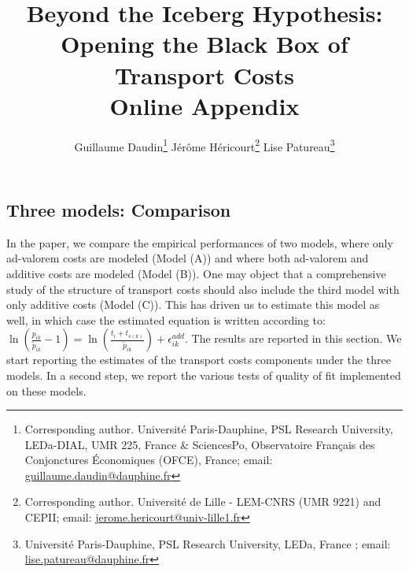 \documentclass[11pt,twoside, authoryear]{elsarticle}
\begin{document}
\title{\textbf{Beyond the Iceberg Hypothesis: \\Opening the Black Box of Transport Costs}\\Online Appendix}

\author{Guillaume Daudin\footnote{\noindent Corresponding author. Universit\'{e} Paris-Dauphine, PSL Research University, LEDa-DIAL, UMR 225, France \&
SciencesPo, Observatoire Français des Conjonctures \'{E}conomiques (OFCE), France; email: \url{guillaume.daudin@dauphine.fr}} \qquad \quad Jérôme Héricourt\footnote{\noindent Corresponding author. Université de Lille - LEM-CNRS (UMR 9221) and CEPII; email: \url{jerome.hericourt@univ-lille1.fr}} \qquad \quad Lise Patureau\footnote{\noindent Universit\'{e} Paris-Dauphine, PSL Research University, LEDa, France ; email: \url{lise.patureau@dauphine.fr}}}



\maketitle






\tableofcontents
\vspace{1cm}
\newpage
\listoftables

\newpage



%
%
%
%
%			
%			
%				
%
%

	\renewcommand\thesubsubsection{\Alph{subsection}.\arabic{subsubsection}}
	
	\renewcommand\thesubsection{\Alph{subsection}}
	
	
\subsection{Three models: Comparison \label{secoa:additive_only}}

In the paper, we compare the empirical performances of two models, where only ad-valorem costs are modeled (Model (A)) and where both ad-valorem and additive costs are modeled (Model (B)). One may object that a comprehensive study of the structure of transport costs should also include the third model with only additive costs (Model (C)). This has driven us to estimate this model as well, in which case the estimated equation is written according to: $\ln\left(\frac{p_{ik}}{\widetilde{p}_{ik}}-1 \right)= \ln \left(\frac{t_{i} + t_{s(k)}}{\widetilde{p}_{ik}}\right) + \epsilon^{add}_{ik}$. The results are reported in this section. We start reporting the estimates of the transport costs components under the three models. In a second step, we report the various tests of quality of fit implemented on these models.
\end{document}
